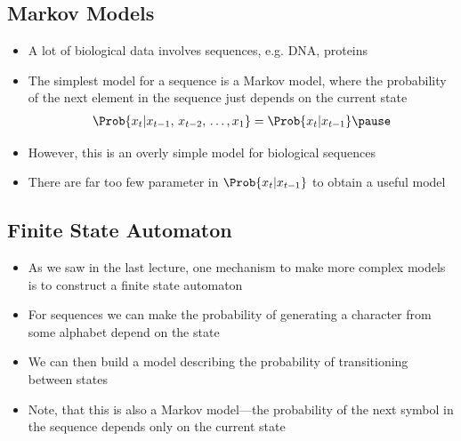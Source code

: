 
\begin{slide}
\section{Markov Models}

\begin{PauseHighLight}
  \begin{itemize}
  \item A lot of biological data involves sequences, e.g. DNA, proteins\pause
  \item The simplest model for a sequence is a Markov model, where the
    probability of the next element in the sequence just depends on the
    current state
    \begin{align*}
      \Prob{x_t|x_{t-1},\, x_{t-2},\, \ldots, x_1} = \Prob{x_t|x_{t-1}}\pause
    \end{align*}
  \item However, this is an overly simple model for biological
    sequences\pause
  \item There are far too few parameter in $\Prob{x_t|x_{t-1}}$ to
    obtain a useful model\pause
  \end{itemize}
\end{PauseHighLight}

\end{slide}


\begin{slide}
\section{Finite State Automaton}

\begin{PauseHighLight}
  \begin{itemize}
  \item As we saw in the last lecture, one mechanism to make more
    complex models is to construct a finite state automaton\pause
  \item For sequences we can make the probability of generating a
    character from some alphabet depend on the state\pause
  \item We can then build a model describing the probability of
    transitioning between states\pause
  \item Note, that this is also a Markov model---the probability of the
    next symbol in the sequence depends only on the current state\pause 
  \end{itemize}
\end{PauseHighLight}

\end{slide}

